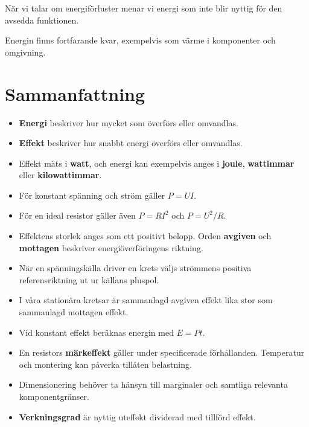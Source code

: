 \documentclass[
  swedish,
  11pt,
  a4paper,
  DIV=11,
  numbers=noendperiod,
  twoside,
  open=any]{scrreprt}
\providecommand{\tightlist}{%
  \setlength{\itemsep}{0pt}\setlength{\parskip}{0pt}}
\begin{document}
\begin{tcolorbox}[enhanced jigsaw, arc=.35mm, bottomrule=.15mm, bottomtitle=1mm, breakable, colback=white, colbacktitle=quarto-callout-important-color!10!white, colframe=quarto-callout-important-color-frame, coltitle=black, left=2mm, leftrule=.75mm, opacityback=0, opacitybacktitle=0.6, rightrule=.15mm, title=\textcolor{quarto-callout-important-color}{\faExclamation}\hspace{0.5em}{Förlorad energi har inte försvunnit}, titlerule=0mm, toprule=.15mm, toptitle=1mm]

När vi talar om energiförluster menar vi energi som inte blir nyttig för
den avsedda funktionen.

Energin finns fortfarande kvar, exempelvis som värme i komponenter och
omgivning.

\end{tcolorbox}

\section{Sammanfattning}\label{sec-effekt-sammanfattning}

\begin{itemize}
\tightlist
\item
  \textbf{Energi} beskriver hur mycket som överförs eller omvandlas.
\item
  \textbf{Effekt} beskriver hur snabbt energi överförs eller omvandlas.
\item
  Effekt mäts i \textbf{watt}, och energi kan exempelvis anges i
  \textbf{joule}, \textbf{wattimmar} eller \textbf{kilowattimmar}.
\item
  För konstant spänning och ström gäller \(P = UI\).
\item
  För en ideal resistor gäller även \(P = RI^2\) och \(P = U^2/R\).
\item
  Effektens storlek anges som ett positivt belopp. Orden
  \textbf{avgiven} och \textbf{mottagen} beskriver energiöverföringens
  riktning.
\item
  När en spänningskälla driver en krets väljs strömmens positiva
  referensriktning ut ur källans pluspol.
\item
  I våra stationära kretsar är sammanlagd avgiven effekt lika stor som
  sammanlagd mottagen effekt.
\item
  Vid konstant effekt beräknas energin med \(E = Pt\).
\item
  En resistors \textbf{märkeffekt} gäller under specificerade
  förhållanden. Temperatur och montering kan påverka tillåten
  belastning.
\item
  Dimensionering behöver ta hänsyn till marginaler och samtliga
  relevanta komponentgränser.
\item
  \textbf{Verkningsgrad} är nyttig uteffekt dividerad med tillförd
  effekt.
\end{itemize}
\end{document}
